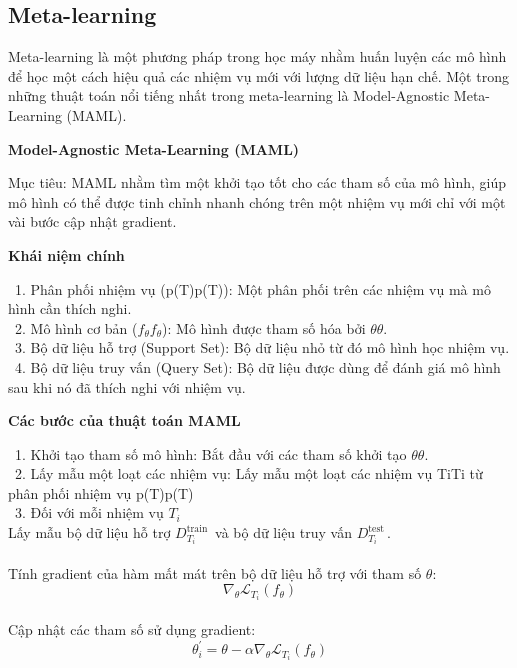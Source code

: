 \subsection{Meta-learning}
Meta-learning là một phương pháp trong học máy nhằm huấn luyện các mô hình để học một cách hiệu quả các nhiệm vụ mới với lượng dữ liệu hạn chế. Một trong những thuật toán nổi tiếng nhất trong meta-learning là Model-Agnostic Meta-Learning (MAML).
\par
\textbf{Model-Agnostic Meta-Learning (MAML)}
\par
Mục tiêu: MAML nhằm tìm một khởi tạo tốt cho các tham số của mô hình, giúp mô hình có thể được tinh chỉnh nhanh chóng trên một nhiệm vụ mới chỉ với một vài bước cập nhật gradient.
\par
\textbf{Khái niệm chính}
\par
    \indent\textbullet\ 1.	Phân phối nhiệm vụ (p(T)p(T)): Một phân phối trên các nhiệm vụ mà mô hình cần thích nghi.\\
    \indent\textbullet\ 2.	Mô hình cơ bản (\(f_\theta f_\theta\)): Mô hình được tham số hóa bởi \(\theta \theta\).\\
    \indent\textbullet\ 3.	Bộ dữ liệu hỗ trợ (Support Set): Bộ dữ liệu nhỏ từ đó mô hình học nhiệm vụ.\\
    \indent\textbullet\ 4.	Bộ dữ liệu truy vấn (Query Set): Bộ dữ liệu được dùng để đánh giá mô hình sau khi nó đã thích nghi với nhiệm vụ.\\
\par
\textbf{Các bước của thuật toán MAML}
\par
    \indent\textbullet\ 1.	Khởi tạo tham số mô hình: Bắt đầu với các tham số khởi tạo \(\theta \theta\).\\
    \indent\textbullet\ 2.	Lấy mẫu một loạt các nhiệm vụ: Lấy mẫu một loạt các nhiệm vụ {Ti}{Ti} từ phân phối nhiệm vụ p(T)p(T)\\
    \indent\textbullet\ 3. Đối với mỗi nhiệm vụ \(T_i\)\\
    	Lấy mẫu bộ dữ liệu hỗ trợ \(D_{T_i}^{\mathrm{train\ }}\) và bộ dữ liệu truy vấn \(D_{T_i}^{\mathrm{test\ }}\).\\ \\
     	Tính gradient của hàm mất mát trên bộ dữ liệu hỗ trợ với tham số \(\theta\):\\
            \[\nabla_\theta\mathcal{L}_{T_i}\left(f_\theta\right)\] \\
            Cập nhật các tham số sử dụng gradient:\\
            \[\theta_i^\prime=\theta-\alpha\nabla_\theta\mathcal{L}_{T_i}\left(f_\theta\right)\] \\
